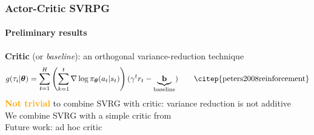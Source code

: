 \documentclass[aspectratio=169]{beamer}
\newcommand{\enb}[1]{\textcolor{poliblue1}{\textbf{#1}}}
\newcommand{\eno}[1]{\textcolor{orange}{\textbf{#1}}}
\newcommand{\vtheta}{\boldsymbol{\theta}}
\begin{document}
\begin{frame} 
\frametitle{Actor-Critic SVRPG}
\framesubtitle{Preliminary results}

\enb{Critic} (or \textit{baseline}): an orthogonal variance-reduction technique
\begin{equation*}
	g(\tau_i\vert\vtheta) = \sum_{t=1}^{H}\left(\sum_{k=1}^t\nabla\log\pi_{\vtheta}(a_t\vert s_t)\right)(\gamma^tr_t - \underbrace{\mathbf{b}}_{\text{baseline}})\qquad\text{\citep{peters2008reinforcement}}
\end{equation*}
\vfill
\eno{Not trivial} to combine SVRG with critic: variance reduction is not additive\\
\vfill
We combine SVRG with a simple critic from~\citet{duan2016benchmarking}\\
\vfill
Future work: ad hoc critic

\end{frame}
\end{document}
